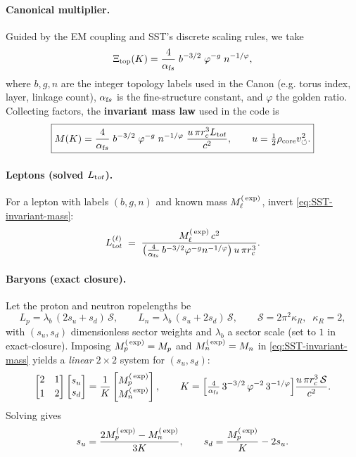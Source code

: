 \documentclass[11pt]{article}
\begin{document}
\paragraph{Canonical multiplier.}
    Guided by the EM coupling and SST’s discrete scaling rules, we take
    \[
        \Xi_{\text{top}}(K)=\frac{4}{\alpha_{\textrm fs}}\;b^{-3/2}\;\varphi^{-g}\;n^{-1/\varphi},
    \]
    where $b,g,n$ are the integer topology labels used in the Canon (e.g. torus index, layer, linkage count), $\alpha_{\textrm fs}$ is the fine-structure constant, and $\varphi$ the golden ratio. Collecting factors, the \textbf{invariant mass law} used in the code is
    \begin{equation*}
    \boxed{M(K)=\frac{4}{\alpha_{\textrm fs}}\;b^{-3/2}\;\varphi^{-g}\;n^{-1/\varphi}\;
    \frac{u\,\pi r_c^3 L_{\textrm tot}}{c^2},
        \qquad
        u=\tfrac{1}{2}\rho_{\text{core}}v_{\circlearrowleft}^2.
    }\label{eq:SST-invariant-mass}
    \end{equation*}

\paragraph{Leptons (solved $L_{\textrm tot}$).}
    For a lepton with labels $(b,g,n)$ and known mass $M_\ell^{\textrm(\exp)}$, invert \eqref{eq:SST-invariant-mass}:
    \[
        L_{\textrm tot}^{(\ell)} \;=\;
        \frac{M_\ell^{\textrm(\exp)}\,c^2}{\big(\tfrac{4}{\alpha_{\textrm fs}}\,b^{-3/2}\varphi^{-g}n^{-1/\varphi}\big)\,u\,\pi r_c^3}.
    \]

\paragraph{Baryons (exact closure).}
    Let the proton and neutron ropelengths be
    \[
        L_p=\lambda_b\,(2s_u+s_d)\,\mathcal S,\qquad
        L_n=\lambda_b\,(s_u+2s_d)\,\mathcal S,\qquad
        \mathcal S=2\pi^2\kappa_R,\;\;\kappa_R=2,
    \]
    with $(s_u,s_d)$ dimensionless sector weights and $\lambda_b$ a sector scale (set to $1$ in exact-closure).
    Imposing $M_p^{\textrm(\exp)}=M_p$ and $M_n^{\textrm(\exp)}=M_n$ in \eqref{eq:SST-invariant-mass} yields a \emph{linear} $2\times2$ system for $(s_u,s_d)$:
    \[
        \begin{bmatrix}
        2 & 1\\[2pt]
        1 & 2
        \end{bmatrix}
        \begin{bmatrix}
        s_u\\ s_d
        \end{bmatrix}

        =
        \frac{1}{K}
        \begin{bmatrix}
        M_p^{\textrm(\exp)}\\ M_n^{\textrm(\exp)}
        \end{bmatrix},
        \qquad
        K=\Big[\tfrac{4}{\alpha_{\textrm fs}}\,3^{-3/2}\,\varphi^{-2}\,3^{-1/\varphi}\Big]\frac{u\,\pi r_c^3\,\mathcal S}{c^2}.
    \]
    Solving gives
    \[
        s_u=\frac{2M_p^{\textrm(\exp)}-M_n^{\textrm(\exp)}}{3K},
        \qquad
        s_d=\frac{M_p^{\textrm(\exp)}}{K}-2s_u.
    \]
\end{document}
